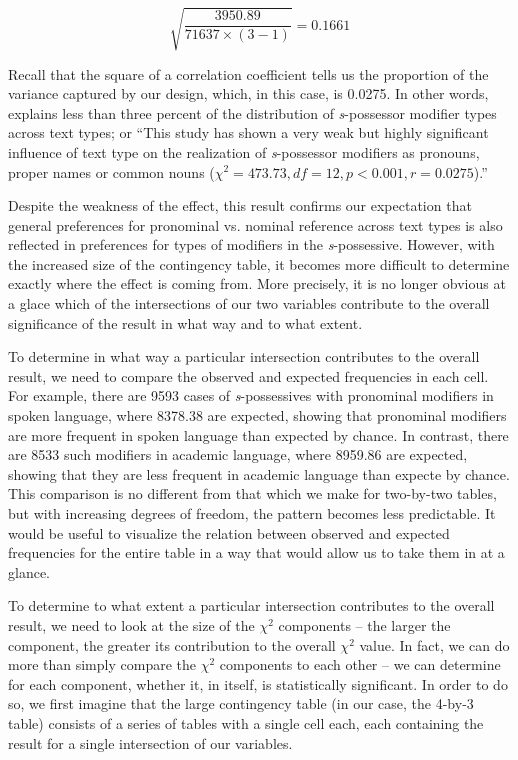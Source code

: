 $$\sqrt{\frac{3950.89}{71637 \times (3-1)}} = 0.1661$$ %

Recall that the square of a correlation coefficient tells us the proportion of the variance captured by our design, which, in this case, is 0.0275. In other words,  explains less than three percent of the distribution of \textit{s}-possessor modifier types across text types; or ``This study has shown a very weak but highly significant influence of text type on the realization of \textit{s}-possessor modifiers as pronouns, proper names or common nouns ($\chi^2 = 473.73, df = 12, p < 0.001, r = 0.0275$).''

Despite the weakness of the effect, this result confirms our expectation that general preferences for pronominal vs. nominal reference across text types is also reflected in preferences for types of modifiers in the \textit{s}-possessive. However, with the increased size of the contingency table, it becomes more difficult to determine exactly where the effect is coming from. More precisely, it is no longer obvious at a glace which of the intersections of our two variables contribute to the overall significance of the result in what way and to what extent.

To determine in what way a particular intersection contributes to the overall result, we need to compare the observed and expected frequencies in each cell. For example, there are 9593 cases of \textit{s}-possessives with pronominal modifiers in spoken language, where 8378.38 are expected, showing that pronominal modifiers are more frequent in spoken language than expected by chance. In contrast, there are 8533 such modifiers in academic language, where 8959.86 are expected, showing that they are less frequent in academic language than expecte by chance. This comparison is no different from that which we make for two-by-two tables, but with increasing degrees of freedom, the pattern becomes less predictable. It would be useful to visualize the relation between observed and expected frequencies for the entire table in a way that would allow us to take them in at a glance.

To determine to what extent a particular intersection contributes to the overall result, we need to look at the size of the $\chi^2$ components -- the larger the component, the greater its contribution to the overall $\chi^2$ value. In fact, we can do more than simply compare the $\chi^2$ components to each other -- we can determine for each component, whether it, in itself, is statistically significant. In order to do so, we first imagine that the large contingency table (in our case, the 4-by-3 table) consists of a series of tables with a single cell each, each containing the result for a single intersection of our variables.

